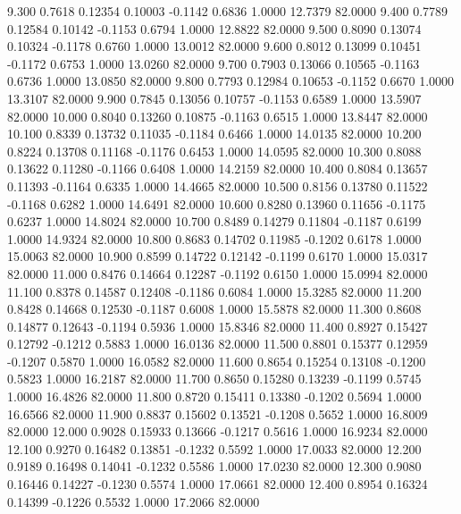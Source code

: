    9.300   0.7618   0.12354   0.10003  -0.1142   0.6836   1.0000  12.7379  82.0000
   9.400   0.7789   0.12584   0.10142  -0.1153   0.6794   1.0000  12.8822  82.0000
   9.500   0.8090   0.13074   0.10324  -0.1178   0.6760   1.0000  13.0012  82.0000
   9.600   0.8012   0.13099   0.10451  -0.1172   0.6753   1.0000  13.0260  82.0000
   9.700   0.7903   0.13066   0.10565  -0.1163   0.6736   1.0000  13.0850  82.0000
   9.800   0.7793   0.12984   0.10653  -0.1152   0.6670   1.0000  13.3107  82.0000
   9.900   0.7845   0.13056   0.10757  -0.1153   0.6589   1.0000  13.5907  82.0000
  10.000   0.8040   0.13260   0.10875  -0.1163   0.6515   1.0000  13.8447  82.0000
  10.100   0.8339   0.13732   0.11035  -0.1184   0.6466   1.0000  14.0135  82.0000
  10.200   0.8224   0.13708   0.11168  -0.1176   0.6453   1.0000  14.0595  82.0000
  10.300   0.8088   0.13622   0.11280  -0.1166   0.6408   1.0000  14.2159  82.0000
  10.400   0.8084   0.13657   0.11393  -0.1164   0.6335   1.0000  14.4665  82.0000
  10.500   0.8156   0.13780   0.11522  -0.1168   0.6282   1.0000  14.6491  82.0000
  10.600   0.8280   0.13960   0.11656  -0.1175   0.6237   1.0000  14.8024  82.0000
  10.700   0.8489   0.14279   0.11804  -0.1187   0.6199   1.0000  14.9324  82.0000
  10.800   0.8683   0.14702   0.11985  -0.1202   0.6178   1.0000  15.0063  82.0000
  10.900   0.8599   0.14722   0.12142  -0.1199   0.6170   1.0000  15.0317  82.0000
  11.000   0.8476   0.14664   0.12287  -0.1192   0.6150   1.0000  15.0994  82.0000
  11.100   0.8378   0.14587   0.12408  -0.1186   0.6084   1.0000  15.3285  82.0000
  11.200   0.8428   0.14668   0.12530  -0.1187   0.6008   1.0000  15.5878  82.0000
  11.300   0.8608   0.14877   0.12643  -0.1194   0.5936   1.0000  15.8346  82.0000
  11.400   0.8927   0.15427   0.12792  -0.1212   0.5883   1.0000  16.0136  82.0000
  11.500   0.8801   0.15377   0.12959  -0.1207   0.5870   1.0000  16.0582  82.0000
  11.600   0.8654   0.15254   0.13108  -0.1200   0.5823   1.0000  16.2187  82.0000
  11.700   0.8650   0.15280   0.13239  -0.1199   0.5745   1.0000  16.4826  82.0000
  11.800   0.8720   0.15411   0.13380  -0.1202   0.5694   1.0000  16.6566  82.0000
  11.900   0.8837   0.15602   0.13521  -0.1208   0.5652   1.0000  16.8009  82.0000
  12.000   0.9028   0.15933   0.13666  -0.1217   0.5616   1.0000  16.9234  82.0000
  12.100   0.9270   0.16482   0.13851  -0.1232   0.5592   1.0000  17.0033  82.0000
  12.200   0.9189   0.16498   0.14041  -0.1232   0.5586   1.0000  17.0230  82.0000
  12.300   0.9080   0.16446   0.14227  -0.1230   0.5574   1.0000  17.0661  82.0000
  12.400   0.8954   0.16324   0.14399  -0.1226   0.5532   1.0000  17.2066  82.0000
